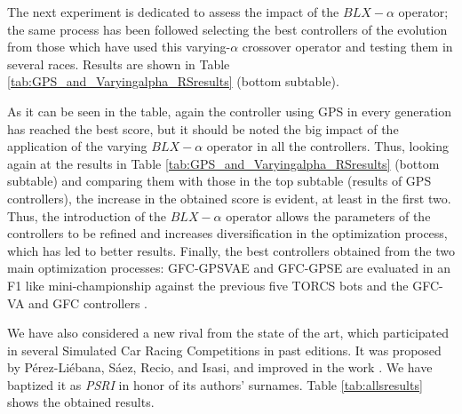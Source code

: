 \documentclass[10pt,journal,compsoc]{IEEEtran}
\begin{document}

The next experiment is dedicated to assess the impact of the
$BLX-\alpha$ operator; the same process has been followed
selecting the best controllers of the evolution from those which
have used this varying-$\alpha$ crossover operator and testing them in several
races. Results are shown in Table \ref{tab:GPS_and_Varyingalpha_RSresults} (bottom subtable). 


As it can be seen in the table, again the controller using GPS in
every generation has reached the best score, but it should be noted the
big impact of the application of the varying $BLX-\alpha$ operator in
all the controllers. Thus, looking again at the results in Table \ref{tab:GPS_and_Varyingalpha_RSresults} (bottom subtable) 
and comparing them with those in the top subtable (results of GPS controllers), the increase in the obtained score is evident, at least in the first
two. 
Thus, the introduction of the $BLX-\alpha$ operator allows the parameters of the controllers to be refined and increases diversification in the optimization process, which has led to better results.
Finally, the best controllers obtained from the two main optimization
processes: {\sf GFC-GPSVAE} and {\sf GFC-GPSE} are evaluated in an F1 like mini-championship against the previous five TORCS bots and the {\sf GFC-VA}\cite{DBLP:conf/cig/SalemMG19} and {\sf GFC} controllers  \cite{salem_cig2018}. 



We have also considered a new rival from the state of the art, which participated in several Simulated Car Racing Competitions in past editions. 
It was proposed by P{\'e}rez-Li{\'e}bana, S{\'a}ez, Recio, and Isasi, and improved in the work \cite{PerezEvolvingFuzzy09}. We have baptized it as \textit{PSRI} in honor of its authors' surnames. 
Table \ref{tab:allsresults} shows the obtained results.
%
\end{document}
